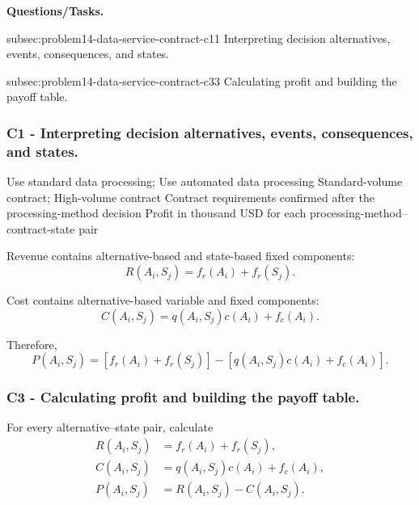 \textbf{Questions/Tasks.}
\begin{enumerate}
	\CriterionTask
	{subsec:problem14-data-service-contract-c1}{1}
	{Interpreting decision alternatives, events, consequences, and states.}

	\CriterionTask
	{subsec:problem14-data-service-contract-c3}{3}
	{Calculating profit and building the payoff table.}
\end{enumerate}

\subsubsection*{C1 - Interpreting decision alternatives, events, consequences, and states.}
\label{subsec:problem14-data-service-contract-c1}

\DecisionElementsTable
{Use standard data processing; Use automated data processing}
{Standard-volume contract; High-volume contract}
{Contract requirements confirmed after the processing-method decision}
{Profit in thousand USD for each processing-method--contract-state pair}

Revenue contains alternative-based and state-based fixed components:
\[
R(A_i,S_j)
=
f_r(A_i)+f_r(S_j).
\]

Cost contains alternative-based variable and fixed components:
\[
C(A_i,S_j)
=
q(A_i,S_j)c(A_i)+f_c(A_i).
\]

Therefore,
\[
P(A_i,S_j)
=
\left[
f_r(A_i)+f_r(S_j)
\right]
-
\left[
q(A_i,S_j)c(A_i)+f_c(A_i)
\right].
\]


\subsubsection*{C3 - Calculating profit and building the payoff table.}
\label{subsec:problem14-data-service-contract-c3}

For every alternative--state pair, calculate
\[
\begin{aligned}
	R(A_i,S_j)
	&=
	f_r(A_i)+f_r(S_j),
	\\
	C(A_i,S_j)
	&=
	q(A_i,S_j)c(A_i)+f_c(A_i),
	\\
	P(A_i,S_j)
	&=
	R(A_i,S_j)-C(A_i,S_j).
\end{aligned}
\]

